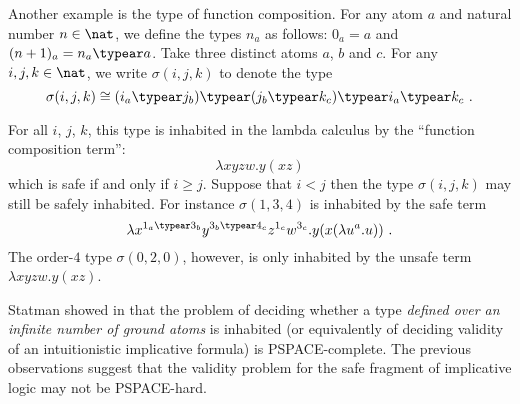 Another example is the type of function composition. For any atom
$a$ and natural number $n\in\nat$, we define the types $n_a$ as
follows: $0_a = a$ and $(n+1)_a = n_a \typear a$. Take three
distinct atoms $a$, $b$ and $c$. For any $i,j,k\in\nat$, we write
$\sigma(i,j,k)$ to denote the type
$$\sigma(i,j,k) \cong (i_a \typear j_b) \typear (j_b \typear k_c) \typear i_a \typear
k_c \ .$$

For all $i$, $j$, $k$, this type is inhabited in the lambda calculus
by the ``function composition term'':
$$\lambda x y z w . y (x z) $$
which is safe if and only if $i\geq j$. Suppose that $i<j$ then the type
$\sigma(i,j,k)$ may still be safely inhabited. For instance
$\sigma(1,3,4)$ is inhabited by the safe term
$$ \lambda x^{1_a \typear 3_b} y^{3_b \typear 4_c} z^{1_c} w^{3_c} . y (x (\lambda u^a . u)) \ .$$
The order-$4$ type $\sigma(0,2,0)$, however, is only inhabited by the unsafe term $\lambda x y z w. y (x z) $.


Statman showed in \cite{Statman1979} that the problem of deciding
whether a type \emph{defined over an infinite number of ground
atoms} is inhabited (or equivalently of deciding validity of an
intuitionistic implicative formula) is PSPACE-complete. The previous
observations suggest that the validity problem for the safe fragment
of implicative logic may not be PSPACE-hard.
